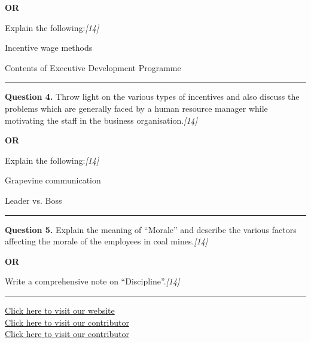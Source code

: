 \documentclass[11pt,a4paper]{article}
\newcommand{\pts}[1]{\hfill   \textit{[#1]}}
\begin{document}
\centerline{   \textbf{OR}}

Explain the following:\pts{14}

\begin{parts}
  \item Incentive wage methods
  \item Contents of Executive Development Programme
\end{parts}

\medskip\rule{\linewidth}{0.2pt}




\noindent   \textbf{Question 4.}
Throw light on the various types of incentives and also discuss the problems which are generally faced by a human resource manager while motivating the staff in the business organisation.\pts{14}

\centerline{   \textbf{OR}}

Explain the following:\pts{14}

\begin{parts}
  \item Grapevine communication
  \item Leader vs. Boss
\end{parts}

\medskip\rule{\linewidth}{0.2pt}




\noindent   \textbf{Question 5.}
Explain the meaning of ``Morale'' and describe the various factors affecting the morale of the employees in coal mines.\pts{14}

\centerline{   \textbf{OR}}

Write a comprehensive note on ``Discipline''.\pts{14}

\vfill
\rule{\linewidth}{0.4pt}

\begin{center}\small
\href{https://bhu-exam.vercel.app/}{Click here to visit our website}\\[4pt]
\href{https://me-aryan.vercel.app/}{Click here to visit our contributor}\\[4pt]
\href{https://quashan-me.vercel.app/}{Click here to visit our contributor}
\end{center}
\end{document}
